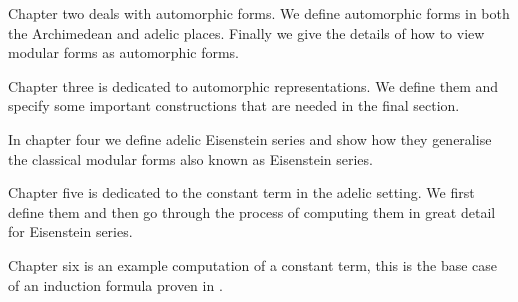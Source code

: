 Chapter two deals with automorphic forms. We define automorphic forms in both the Archimedean and adelic places. Finally we give the details of how to view modular forms as automorphic forms. 

Chapter three is dedicated to automorphic representations. We define them and specify some important constructions that are needed in the final section.

In chapter four we define adelic Eisenstein series and show how they generalise the classical modular forms also known as Eisenstein series.

Chapter five is dedicated to the constant term in the adelic setting. We first define them and then go through the process of computing them in great detail for Eisenstein series. 

Chapter six is an example computation of a constant term, this is the base case of an induction formula proven in \cite{jiangPolesCertainResidual2013}.


